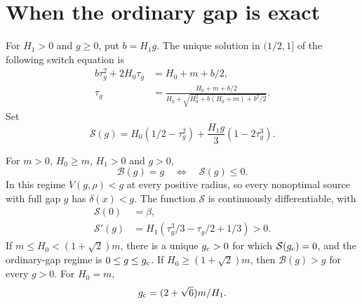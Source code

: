 \section{When the ordinary gap is exact}
\label{gapregime:section}
For $H_1>0$ and $g\ge0$, put $b=H_1g$. The unique solution in
$(1/2,1]$ of the following switch equation is
\begin{align}
 b\tau_g^2+2H_0\tau_g&=H_0+m+b/2,
       \label{gapregime:switch}\\
 \tau_g&=\frac{H_0+m+b/2}
 {H_0+\sqrt{H_0^2+b(H_0+m)+b^2/2}}.
       \label{gapregime:tau}
\end{align}
Set
\begin{equation}\label{gapregime:coefficient}
 \mathcal S(g)=H_0(1/2-\tau_g^2)
          +\frac{H_1g}{3}(1-2\tau_g^3).
\end{equation}

\begin{theorem}\label{gapregime:main}
For $m>0$, $H_0\ge m$, $H_1>0$ and $g>0$,
\begin{equation}\label{gapregime:equivalence}
 \mathcal B(g)=g\quad\Longleftrightarrow\quad\mathcal S(g)\le0.
\end{equation}
In this regime $V(g,\rho)<g$ at every positive radius, so every
nonoptimal source with full gap $g$ has $\delta(x)<g$.
The function $\mathcal S$ is continuously differentiable, with
\begin{align}
 \mathcal S(0)&=\beta,
       \label{gapregime:initial}\\
 \mathcal S'(g)&=H_1(\tau_g^3/3-\tau_g/2+1/3)>0.
       \label{gapregime:derivative}
\end{align}
If $m\le H_0<(1+\sqrt2)m$, there is a unique $g_{\rm c}>0$ for which
$\mathcal S(g_{\rm c})=0$, and the ordinary-gap regime is
$0\le g\le g_{\rm c}$. If $H_0\ge(1+\sqrt2)m$, then
$\mathcal B(g)>g$ for every $g>0$. For $H_0=m$,
\begin{equation}\label{gapregime:unit-threshold}
 g_{\rm c}=(2+\sqrt6)m/H_1.
\end{equation}
\end{theorem}

